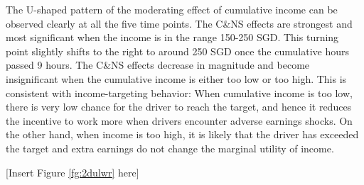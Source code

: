 \documentclass[reviewmode,AEJ]{AEA}
\begin{document}
The U-shaped pattern of the moderating effect of cumulative income can be observed clearly at all the five time points. The C\&NS effects are strongest and most significant when the income is in the range 150-250 SGD. This turning point slightly shifts to the right to around 250 SGD once the cumulative hours passed 9 hours. The C\&NS effects decrease in magnitude and become insignificant when the cumulative income is either too low or too high. This is consistent with income-targeting behavior: When cumulative income is too low, there is very low chance for the driver to reach the target, and hence it reduces the incentive to work more when drivers encounter adverse earnings shocks. On the other hand, when income is too high, it is likely that the driver has exceeded the target and extra earnings do not change the marginal utility of income.


\begin{center}
	[Insert Figure \ref{fg:2dulwr} here]
\end{center}

\end{document}
